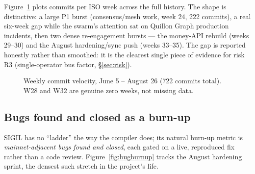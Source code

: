 Figure~\ref{fig:velocity} plots commits per ISO week across the full history. The shape is distinctive: a large P1 burst (consensus/mesh work, week 24, 222 commits), a real six-week gap while the swarm's attention sat on Quillon Graph production incidents, then two dense re-engagement bursts --- the money-API rebuild (weeks 29--30) and the August hardening/sync push (weeks 33--35). The gap is reported honestly rather than smoothed: it is the clearest single piece of evidence for risk R3 (single-operator bus factor, \S\ref{sec:risk}).

\begin{figure}[h]
\centering
{}
\caption{Weekly commit velocity, June 5 -- August 26 (722 commits total). W28 and W32 are genuine zero weeks, not missing data.}
\label{fig:velocity}
\end{figure}

\subsection{Bugs found and closed as a burn-up}

SIGIL has no ``ladder'' the way the compiler does; its natural burn-up metric is \emph{mainnet-adjacent bugs found and closed}, each gated on a live, reproduced fix rather than a code review. Figure~\ref{fig:bugburnup} tracks the August hardening sprint, the densest such stretch in the project's life.

